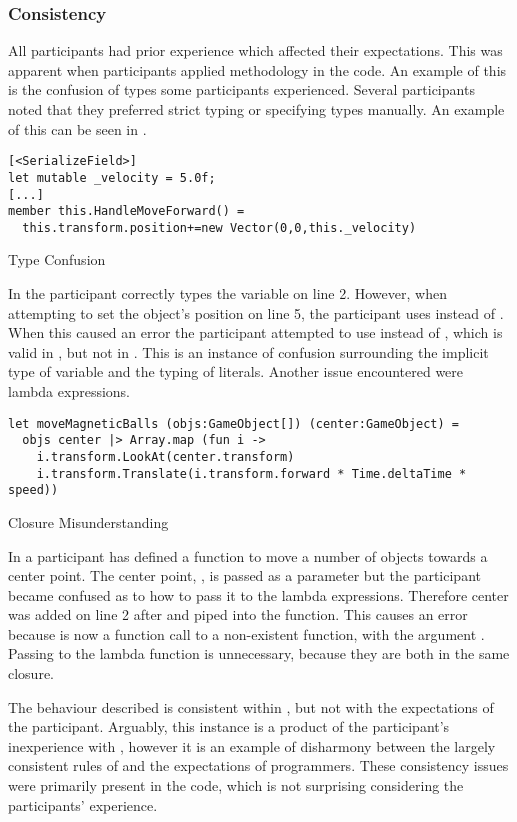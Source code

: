 \subsubsection{Consistency}\label{sec:part-cons} %
All participants had prior \cs experience which affected their expectations. This was apparent when participants applied \cs methodology in the \fs code. An example of this is the confusion of types some participants experienced. Several participants noted that they preferred strict typing or specifying types manually. An example of this can be seen in .

\begin{listing}[H]
\begin{verbatim}
[<SerializeField>]
let mutable _velocity = 5.0f;
[...]
member this.HandleMoveForward() =
  this.transform.position+=new Vector(0,0,this._velocity)
\end{verbatim}
\caption{Type Confusion}
\label{lst:type-conf}
\end{listing}

In  the participant correctly types the  variable on line 2. However, when attempting to set the object's position on line 5, the participant uses  instead of . When this caused an error the participant attempted to use  instead of , which is valid in \cs, but not in \fs. This is an instance of confusion surrounding the implicit type of variable and the typing of literals. Another issue encountered were lambda expressions.

\begin{listing}[H]
\begin{verbatim}
let moveMagneticBalls (objs:GameObject[]) (center:GameObject) =
  objs center |> Array.map (fun i ->
    i.transform.LookAt(center.transform)
    i.transform.Translate(i.transform.forward * Time.deltaTime * speed))
\end{verbatim}
\caption{Closure Misunderstanding}
\label{lst:clos-mis}
\end{listing}

In  a participant has defined a function to move a number of objects towards a center point. The center point, , is passed as a parameter but the participant became confused as to how to pass it to the lambda expressions. Therefore center was added on line 2 after  and piped into the  function. This causes an error because  is now a function call to a non-existent function,  with the argument . Passing  to the lambda function is unnecessary, because they are both in the same closure.

The behaviour described is consistent within \fs, but not with the expectations of the participant. Arguably, this instance is a product of the participant's inexperience with \fs, however it is an example of disharmony between the largely consistent rules of \fs and the expectations of programmers. These consistency issues were primarily present in the \fs code, which is not surprising considering the participants' experience.
